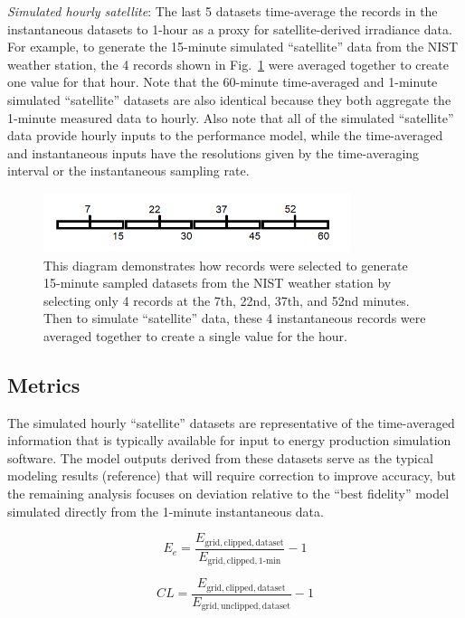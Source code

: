 \documentclass[conference]{IEEEtran}
\begin{document}
\emph{Simulated hourly satellite}: The last 5 datasets time-average the records in the instantaneous datasets to 1-hour as a proxy for satellite-derived irradiance data. For example, to generate the 15-minute simulated ``satellite'' data from the NIST weather station, the 4 records shown in Fig.~\ref{fig:sampling-diagram} were averaged together to create one value for that hour. Note that the 60-minute time-averaged and 1-minute simulated ``satellite'' datasets are also identical because they both aggregate the 1-minute measured data to hourly. Also note that all of the simulated ``satellite'' data provide hourly inputs to the performance model, while the time-averaged and instantaneous inputs have the resolutions given by the time-averaging interval or the instantaneous sampling rate.

\begin{figure}[htbp]
\centerline{\includegraphics[width=9cm]{sampling-diagram.png}}
\caption{This diagram demonstrates how records were selected to generate 15-minute sampled datasets from the NIST weather station by selecting only 4 records at the 7th, 22nd, 37th, and 52nd minutes. Then to simulate ``satellite'' data, these 4 instantaneous records were averaged together to create a single value for the hour.}
\label{fig:sampling-diagram}
\end{figure}

\subsection{Metrics}
The simulated hourly ``satellite'' datasets are representative of the time-averaged information that is typically available for input to energy production simulation software. The model outputs derived from these datasets serve as the typical modeling results (reference) that will require correction to improve accuracy, but the remaining analysis focuses on deviation relative to the ``best fidelity'' model simulated directly from the 1-minute instantaneous data.

\begin{equation} \label{eq:1}
E_e = \frac{E_\mathrm{grid,clipped,dataset}}{E_\mathrm{grid,clipped,1\text{-}min}} - 1
\end{equation}

\begin{equation} \label{eq:2}
\mathit{CL} = \frac{E_\mathrm{grid,clipped,dataset}}{E_\mathrm{grid,unclipped,dataset}} - 1
\end{equation}
\end{document}
